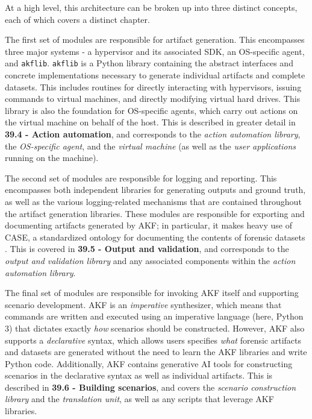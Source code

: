 At a high level, this architecture can be broken up into three distinct
concepts, each of which covers a distinct chapter.

The first set of modules are responsible for artifact generation. This
encompasses three major systems - a hypervisor and its associated SDK,
an OS-specific agent, and \texttt{akflib}. \texttt{akflib} is a Python
library containing the abstract interfaces and concrete implementations
necessary to generate individual artifacts and complete datasets. This
includes routines for directly interacting with hypervisors, issuing
commands to virtual machines, and directly modifying virtual hard
drives. This library is also the foundation for OS-specific agents,
which carry out actions on the virtual machine on behalf of the host.
This is described in greater detail in \textbf{39.4 - Action
automation}, and corresponds to the \emph{action automation library},
the \emph{OS-specific agent}, and the \emph{virtual machine} (as well as
the \emph{user applications} running on the machine).

The second set of modules are responsible for logging and reporting.
This encompasses both independent libraries for generating outputs and
ground truth, as well as the various logging-related mechanisms that are
contained throughout the artifact generation libraries. These modules
are responsible for exporting and documenting artifacts generated by
AKF; in particular, it makes heavy use of CASE, a standardized ontology
for documenting the contents of forensic datasets
\cite{caseyAdvancingCoordinatedCyberinvestigations2017}. This is
covered in \textbf{39.5 - Output and validation}, and corresponds to the
\emph{output and validation library} and any associated components
within the \emph{action automation library}.

The final set of modules are responsible for invoking AKF itself and
supporting scenario development. AKF is an \emph{imperative}
synthesizer, which means that commands are written and executed using an
imperative language (here, Python 3) that dictates exactly \emph{how}
scenarios should be constructed. However, AKF also supports a
\emph{declarative} syntax, which allows users specifies \emph{what}
forensic artifacts and datasets are generated without the need to learn
the AKF libraries and write Python code. Additionally, AKF contains
generative AI tools for constructing scenarios in the declarative syntax
as well as individual artifacts. This is described in \textbf{39.6 -
Building scenarios}, and covers the \emph{scenario construction library}
and the \emph{translation unit}, as well as any scripts that leverage
AKF libraries.

